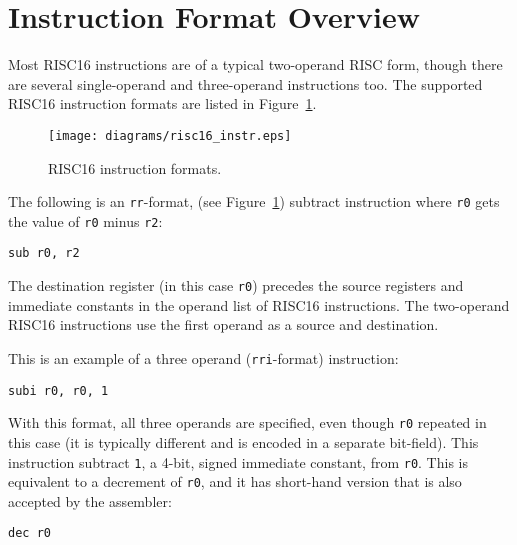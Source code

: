 \section{Instruction Format Overview}

Most RISC16 instructions are of a typical two-operand RISC form, though there are
several single-operand and three-operand instructions too. The supported RISC16
instruction formats are listed in Figure~\ref{RISCPROG_Instruction_Formats}.

\begin{figure}[h!]
\begin{center}
\texttt{[image: diagrams/risc16\_instr.eps]}
\caption[RISC16 instruction formats]{RISC16 instruction formats.}
\label{RISCPROG_Instruction_Formats}
\end{center}
\end{figure}

The following is an \texttt{rr}-format, (see
Figure~\ref{RISCPROG_Instruction_Formats}) subtract instruction where \texttt{r0}
gets the value of \texttt{r0} minus \texttt{r2}:

\begin{center}
\begin{minipage}{0.5\linewidth}
\texttt{sub r0, r2}
\end{minipage}
\end{center}

The destination register (in this case \texttt{r0}) precedes the source registers
and immediate constants in the operand list of RISC16 instructions. The
two-operand RISC16 instructions use the first operand as a source and
destination.

This is an example of a three operand (\texttt{rri}-format) instruction:

\begin{center}
\begin{minipage}{0.5\linewidth}
\texttt{subi r0, r0, 1}
\end{minipage}
\end{center}

With this format, all three operands are specified, even though \texttt{r0}
repeated in this case (it is typically different and is encoded in a separate
bit-field). This instruction subtract \texttt{1}, a 4-bit, signed immediate
constant, from \texttt{r0}. This is equivalent to a decrement of \texttt{r0}, and
it has short-hand version that is also accepted by the assembler:

\begin{center}
\begin{minipage}{0.5\linewidth}
\texttt{dec r0}
\end{minipage}
\end{center}

